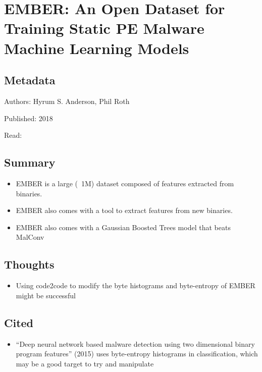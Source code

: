 \documentclass{article}
\begin{document}
\pagebreak


\section*{EMBER: An Open Dataset for Training Static PE Malware Machine Learning Models}

\subsection*{Metadata}

\noindent Authors: Hyrum S. Anderson, Phil Roth

\noindent Published: 2018

\noindent Read:

\subsection*{Summary}
\begin{itemize}
\item EMBER is a large (~1M) dataset composed of features extracted from binaries.
\item EMBER also comes with a tool to extract features from new binaries.
\item EMBER also comes with a Gaussian Boosted Trees model that beats MalConv
\end{itemize}

\subsection*{Thoughts}
\begin{itemize}
\item Using code2code to modify the byte histograms and byte-entropy of EMBER might be successful
\end{itemize}

\subsection*{Cited}
\begin{itemize}
\item ``Deep neural network based malware detection using two dimensional binary program features'' (2015) uses byte-entropy histograms in classification, which may be a good target to try and manipulate
\end{itemize}
\end{document}
